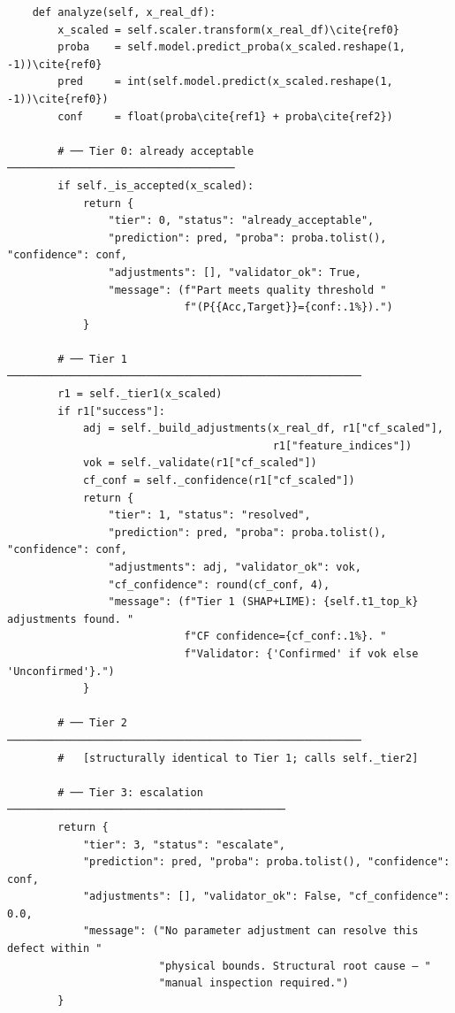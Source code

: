 \begin{verbatim}
    def analyze(self, x_real_df):
        x_scaled = self.scaler.transform(x_real_df)\cite{ref0}
        proba    = self.model.predict_proba(x_scaled.reshape(1, -1))\cite{ref0}
        pred     = int(self.model.predict(x_scaled.reshape(1, -1))\cite{ref0})
        conf     = float(proba\cite{ref1} + proba\cite{ref2})

        # ── Tier 0: already acceptable ────────────────────────────────────
        if self._is_accepted(x_scaled):
            return {
                "tier": 0, "status": "already_acceptable",
                "prediction": pred, "proba": proba.tolist(), "confidence": conf,
                "adjustments": [], "validator_ok": True,
                "message": (f"Part meets quality threshold "
                            f"(P{{Acc,Target}}={conf:.1%}).")
            }

        # ── Tier 1 ────────────────────────────────────────────────────────
        r1 = self._tier1(x_scaled)
        if r1["success"]:
            adj = self._build_adjustments(x_real_df, r1["cf_scaled"],
                                          r1["feature_indices"])
            vok = self._validate(r1["cf_scaled"])
            cf_conf = self._confidence(r1["cf_scaled"])
            return {
                "tier": 1, "status": "resolved",
                "prediction": pred, "proba": proba.tolist(), "confidence": conf,
                "adjustments": adj, "validator_ok": vok,
                "cf_confidence": round(cf_conf, 4),
                "message": (f"Tier 1 (SHAP+LIME): {self.t1_top_k} adjustments found. "
                            f"CF confidence={cf_conf:.1%}. "
                            f"Validator: {'Confirmed' if vok else 'Unconfirmed'}.")
            }

        # ── Tier 2 ────────────────────────────────────────────────────────
        #   [structurally identical to Tier 1; calls self._tier2]

        # ── Tier 3: escalation ────────────────────────────────────────────
        return {
            "tier": 3, "status": "escalate",
            "prediction": pred, "proba": proba.tolist(), "confidence": conf,
            "adjustments": [], "validator_ok": False, "cf_confidence": 0.0,
            "message": ("No parameter adjustment can resolve this defect within "
                        "physical bounds. Structural root cause — "
                        "manual inspection required.")
        }
\end{verbatim}

